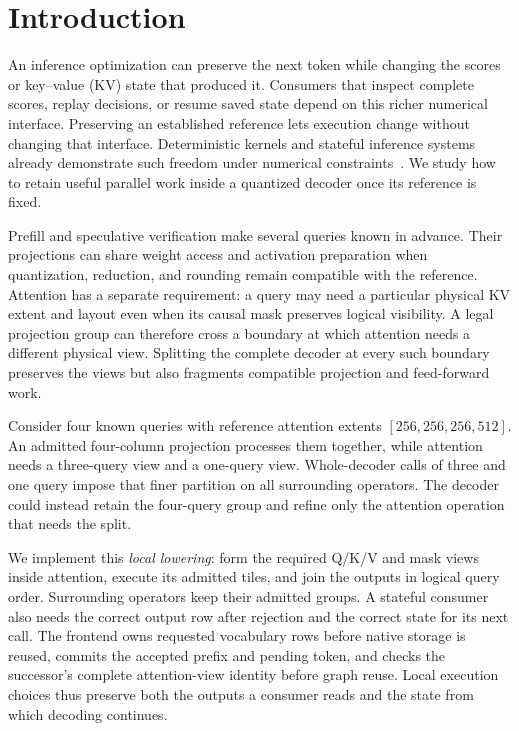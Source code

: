 \section{Introduction}
\label{sec:introduction}

An inference optimization can preserve the next token while changing the scores or key--value (KV) state that produced it. Consumers that inspect complete scores, replay decisions, or resume saved state depend on this richer numerical interface. Preserving an established reference lets execution change without changing that interface. Deterministic kernels and stateful inference systems already demonstrate such freedom under numerical constraints~\cite{thinkingmachines,llm42,vosti,detent}. We study how to retain useful parallel work inside a quantized decoder once its reference is fixed.

Prefill and speculative verification make several queries known in advance. Their projections can share weight access and activation preparation when quantization, reduction, and rounding remain compatible with the reference. Attention has a separate requirement: a query may need a particular physical KV extent and layout even when its causal mask preserves logical visibility. A legal projection group can therefore cross a boundary at which attention needs a different physical view. Splitting the complete decoder at every such boundary preserves the views but also fragments compatible projection and feed-forward work.

Consider four known queries with reference attention extents $[256,256,256,512]$. An admitted four-column projection processes them together, while attention needs a three-query view and a one-query view. Whole-decoder calls of three and one query impose that finer partition on all surrounding operators. The decoder could instead retain the four-query group and refine only the attention operation that needs the split.

We implement this \emph{local lowering}: form the required Q/K/V and mask views inside attention, execute its admitted tiles, and join the outputs in logical query order. Surrounding operators keep their admitted groups. A stateful consumer also needs the correct output row after rejection and the correct state for its next call. The frontend owns requested vocabulary rows before native storage is reused, commits the accepted prefix and pending token, and checks the successor's complete attention-view identity before graph reuse. Local execution choices thus preserve both the outputs a consumer reads and the state from which decoding continues.

